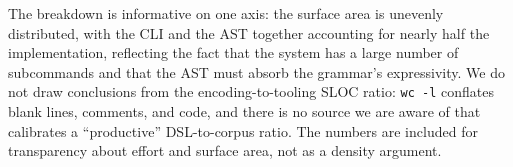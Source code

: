 The breakdown is informative on one axis: the surface area is
unevenly distributed, with the CLI and the AST together accounting
for nearly half the implementation, reflecting the fact that the
system has a large number of subcommands and that the AST must absorb
the grammar's expressivity. We do not draw conclusions from the
encoding-to-tooling SLOC ratio: \texttt{wc -l} conflates blank lines,
comments, and code, and there is no source we are aware of that
calibrates a ``productive'' DSL-to-corpus ratio. The numbers are
included for transparency about effort and surface area, not as a
density argument.
